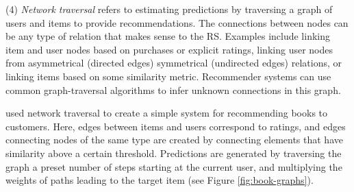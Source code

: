 (4) \emph{Network traversal} refers to estimating predictions by traversing a graph of users and items to provide recommendations.
The connections between nodes can be any type of relation that makes sense to the RS. Examples include linking item and user nodes
based on purchases or explicit ratings, linking user nodes from asymmetrical (directed edges) symmetrical (undirected edges) relations,
or linking items based on some similarity metric.
Recommender systems can use common graph-traversal algorithms to infer unknown connections in this graph.

\cite{Huang2002} used network traversal to create a simple system for recommending books to customers.
Here, edges between items and users correspond to ratings, and edges connecting nodes of the same type
are created by connecting elements that have similarity above a certain threshold. Predictions are generated
by traversing the graph a preset number of steps starting at the current user, and multiplying the weights
of paths leading to the target item (see Figure \ref{fig:book-graphs}).

